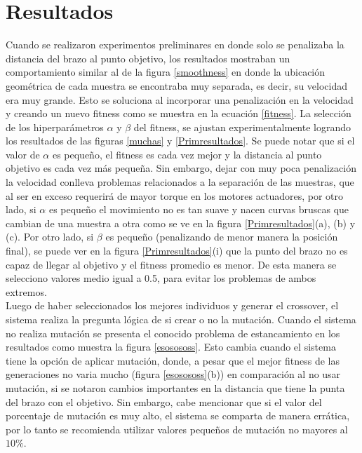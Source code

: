 \documentclass[12pt]{article}
\begin{document}
\section{Resultados}

Cuando se realizaron experimentos preliminares en donde solo se penalizaba la distancia del brazo al punto objetivo, los resultados mostraban un comportamiento similar al de la figura \ref{smoothness} en donde la ubicación geométrica de cada muestra se encontraba muy separada, es decir, su velocidad era muy grande. Esto se soluciona al incorporar una penalización en la velocidad y creando un nuevo fitness como se muestra en la ecuación \eqref{fitness}. La selección de los hiperparámetros $\alpha$ y $\beta$ del fitness, se ajustan experimentalmente logrando los resultados de las figuras \ref{muchas} y \ref{Primresultados}. Se puede notar que si el valor de $\alpha$ es pequeño, el fitness es cada vez mejor y la distancia al punto objetivo es cada vez más pequeña. Sin embargo, dejar con muy poca penalización la velocidad conlleva problemas relacionados a la separación de las muestras, que al ser en exceso requerirá de mayor torque en los motores actuadores, por otro lado, si $\alpha$ es pequeño el movimiento no es tan suave y nacen curvas bruscas que cambian de una muestra a otra como se ve en la figura \ref{Primresultados}(a), (b) y (c). Por otro lado, si $\beta$ es pequeño (penalizando de menor manera la posición final), se puede ver en la figura \ref{Primresultados}(i) que la punto del brazo no es capaz de llegar al objetivo y el fitness promedio es menor. De esta manera se selecciono valores medio igual a 0.5, para evitar los problemas de ambos extremos. \\
Luego de haber seleccionados los mejores individuos y generar el crossover, el sistema realiza la pregunta lógica de si crear o no la mutación. Cuando el sistema no realiza mutación se presenta el conocido problema de estancamiento en los resultados como muestra la figura \ref{esosososs}. Esto cambia cuando el sistema tiene la opción de aplicar mutación, donde, a pesar que el mejor fitness de las generaciones no varia mucho (figura \ref{esosososs}(b)) en comparación al no usar mutación, si se notaron cambios importantes en la distancia que tiene la punta del brazo con el objetivo. Sin embargo, cabe mencionar que si el valor del porcentaje de mutación es muy alto, el sistema se comparta de manera errática, por lo tanto se recomienda utilizar valores pequeños de mutación no mayores al $10\%$.\\
\end{document}
